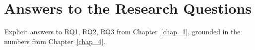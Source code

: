 \section{Answers to the Research Questions}
\label{sec_disc_rq}

Explicit answers to RQ1, RQ2, RQ3 from Chapter~\ref{chap_1}, grounded in the numbers from Chapter~\ref{chap_4}.
